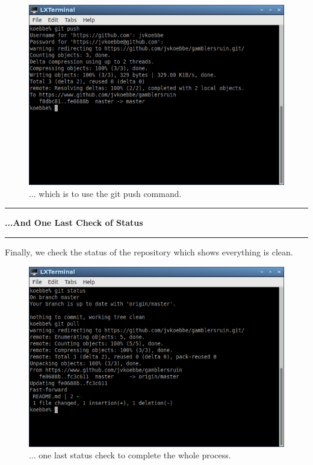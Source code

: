 \documentclass[10pt,fleqn]{article}
\begin{document}
\vfill
\begin{figure}[h]
\centering
\includegraphics[width=5.0in]{../images/git_16.png}
\caption{... which is to use the git push command.}
\end{figure}
\eject
\vskip0.1in\hrule\vskip0.1in\noindent
{\bf ...And One Last Check of Status} 
\vskip0.1in\hrule\vskip0.1in\noindent
Finally, we check the status of the repository which shows everything is clean.
\vfill
\begin{figure}[h]
\centering
\includegraphics[width=5.0in]{../images/git_17.png}
\caption{... one last status check to complete the whole process. }
\end{figure}
\end{document}

